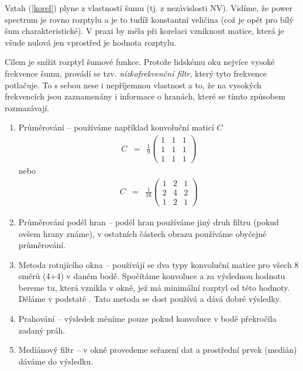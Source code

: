 Vztah (\ref{korel}) plyne z vlastností šumu (tj. z nezávislosti NV). Vidíme, že power spectrum je rovno rozptylu a je to tudíž 
konstantní veličina (což je opět pro bílý šum charakteristické). V praxi by měla při korelaci vzniknout matice,
která je všude nulová jen vprostřed je hodnota rozptylu.


Cílem je snížit rozptyl šumové funkce. Protože lidskému oku nejvíce  vysoké frekvence šumu, provádí
se tzv. {\em nízkofrekvenční filtr}, který tyto frekvence potlačuje. To s sebou nese i nepříjemnou vlastnost a to, že
na vysokých frekvencích jsou zaznamenány i informace o hranách, které se tímto způsobem rozmazávají.

\begin{enumerate}
\item Průměrování -- používáme například konvoluční maticí $C$
\begin{eqnarray}
C&=&\frac{1}{9}\left(\begin{array}{ccc}1&1&1\\1&1&1\\1&1&1\end{array}\right)
\end{eqnarray}
nebo
\begin{eqnarray}
C&=&\frac{1}{16}\left(\begin{array}{ccc}1&2&1\\2&4&2\\1&2&1\end{array}\right)
\end{eqnarray}

\item Průměrování podél hran -- podél hran používáme jiný druh filtru (pokud  ovšem hrany známe), 
v ostatních částech obrazu používáme obyčejné průměrování.

\item Metoda rotujícího okna -- používájí se dva typy konvoluční matice pro všech 8  směrů (4+4) v daném bodě. 
Spočítáme konvoluce a za výslednou hodnotu bereme tu, která vznikla v okně, jež má minimální rozptyl od této 
hodnoty. Děláme v podstatě . Tato metoda se dost používá a dává dobré výsledky.

\item Prahování -- výsledek měníme pouze pokud konvoluce v bodě překročila zadaný práh. 
\item Mediánový filtr -- v okně provedeme seřazení dat a prostřední prvek (medián) dáváme do výsledku. 


\end{enumerate}
